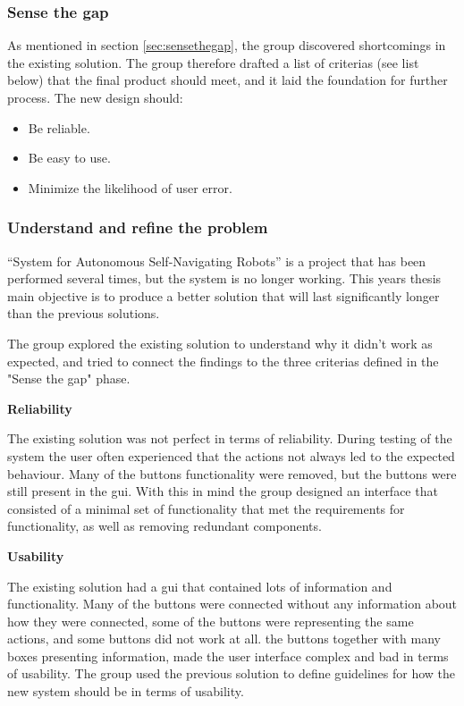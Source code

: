 \subsubsection{Sense the gap}
As mentioned in section \ref{sec:sensethegap}, the group discovered shortcomings in the existing solution. The group therefore drafted a list of criterias (see list below) that the final product should meet, and it laid the foundation for further process. The new design should:

\begin{itemize}
    \item Be reliable.
    \item Be easy to use.
    \item Minimize the likelihood of user error.
\end{itemize}


\subsubsection{Understand and refine the problem}
``System for Autonomous Self-Navigating Robots'' is a project that has been performed several times, but the system is no longer working. This years thesis main objective is to produce a better solution that will last significantly longer than the previous solutions.

The group explored the existing solution to understand why it didn't work as expected, and tried to connect the findings to the three criterias defined in the "Sense the gap" phase.

\textbf{Reliability}

The existing solution was not perfect in terms of reliability. During testing of the system the user often experienced that the actions not always led to the expected behaviour. Many of the buttons functionality were removed, but the buttons were still present in the \acrshort{gui}. With this in mind the group designed an interface that consisted of a minimal set of functionality that met the requirements for functionality, as well as removing redundant components.

\textbf{Usability}

The existing solution had a \acrshort{gui} that contained lots of information and functionality. Many of the buttons were connected without any information about how they were connected, some of the buttons were representing the same actions, and some buttons did not work at all. the buttons together with many boxes presenting information, made the user interface complex and bad in terms of usability. The group used the previous solution to define guidelines for how the new system should be in terms of usability.

